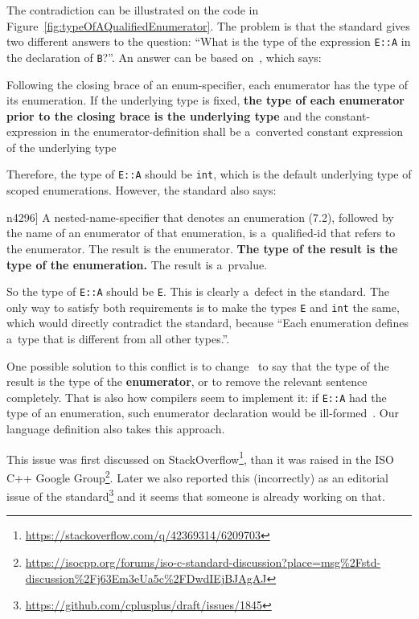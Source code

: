 \documentclass[nolot,nolof,nocover,printed]{fithesis3}
\newcommand{\stdN}[2]{\cite[#2]{#1}\xspace}
\begin{document}
The contradiction can be illustrated on the code in Figure~\ref{fig:typeOfAQualifiedEnumerator}. The problem is that the standard gives two different answers to the question: \enquote{What is the type of the expression \lstinline|E::A| in the declaration of \lstinline|B|?}. An answer can be based on~\stdN{n4296}{\S 7.2/5}, which says:
\begin{displayquote}
\textelp{} Following the closing brace of an enum-specifier, each enumerator has the type of its enumeration. If the underlying type is fixed, \textbf{the type of each enumerator prior to the closing brace is the underlying type} and the constant-expression in the enumerator-definition shall be a~converted constant expression of the underlying type \textelp{}
\end{displayquote}
Therefore, the type of \lstinline|E::A| should be \lstinline|int|, which is the default underlying type of scoped enumerations. However, the standard also says:
\begin{displayquote}[\stdN{n4296}{\S 5.1.1/11}]
A nested-name-specifier that denotes an enumeration (7.2), followed by the name of an enumerator of that enumeration, is a~qualified-id that refers to the enumerator. The result is the enumerator. \textbf{The type of the result is the type of the enumeration.} The result is a~prvalue.
\end{displayquote}
So the type of \lstinline|E::A| should be \lstinline|E|. This is clearly a~defect in the standard. The only way to satisfy both requirements is to make the types \lstinline|E| and \lstinline|int| the same, which would directly contradict the standard, because \enquote{Each enumeration defines a~type that is different from all other types.}\stdN{n4296}{\S 7.2/5}.

One possible solution to this conflict is to change~\stdN{n4296}{\S 5.1.1/11} to say
that the type of the result is the type of the \textbf{enumerator},
or to remove the relevant sentence completely. That is also how compilers seem to implement it: if \lstinline|E::A| had the type of an enumeration, such enumerator declaration would be ill-formed~\stdN{n4296}{\S 5.1.1/5}. Our language definition also takes this approach.

This issue was first discussed on StackOverflow\footnote{\url{https://stackoverflow.com/q/42369314/6209703}}, than it was raised in the ISO C++ Google Group\footnote{\url{https://isocpp.org/forums/iso-c-standard-discussion?place=msg\%2Fstd-discussion\%2Fj63Em3eUa5c\%2FDwdIEjBJAgAJ}}. Later we also reported this (incorrectly) as an editorial issue of the standard\footnote{\url{https://github.com/cplusplus/draft/issues/1845}} and it seems that someone is already working on that.
\end{document}
